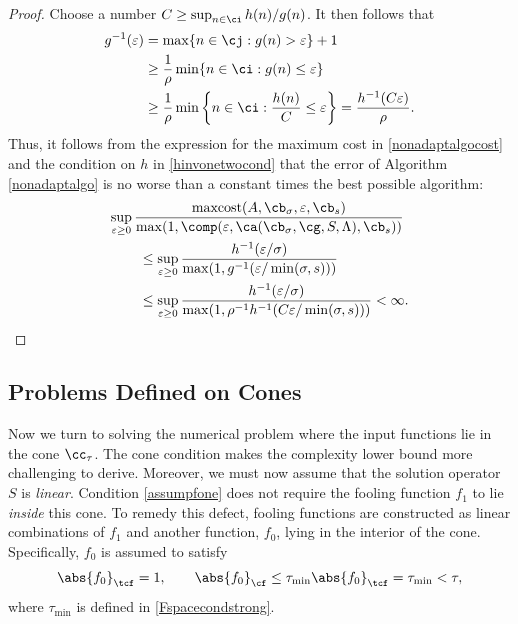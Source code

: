 \documentclass[]{elsarticle}
\DeclareMathOperator{\maxcost}{maxcost}
\theoremstyle{definition}
\theoremstyle{remark}
\newcommand{\Fnorm}[1]{\abs{#1}_{\cf}}
\newcommand{\Ftnorm}[1]{\abs{#1}_{\tcf}}
\begin{document}
\begin{proof}  Choose a number $C \ge \sup_{n \in \ci} h(n)/g(n)$.  It then follows that
\begin{align*}
g^{-1}(\varepsilon) &= \max \{ n \in \cj : g(n) > \varepsilon\}+1 \\ 
& \ge \frac{1}{\rho}\min\{ n \in \ci : g(n) \le \varepsilon\}  \\
& \ge \frac{1}{\rho} \min \left \{ n \in \ci : \frac{h(n)}{C} \le \varepsilon \right\} = \frac{h^{-1}(C \varepsilon)}{\rho}.
\end{align*}
Thus, it follows from the expression for the maximum cost in \eqref{nonadaptalgocost} and the condition on $h$ in \eqref{hinvonetwocond} that the error of Algorithm \ref{nonadaptalgo} is no worse than a constant times the best possible algorithm:
\begin{align*}
\MoveEqLeft{\sup_{\varepsilon \ge 0} \frac{\maxcost(A,\cb_{\sigma},\varepsilon,\cb_{s})}
{\max(1,\comp(\varepsilon,\ca(\cb_{\sigma},\cg,S,\Lambda),\cb_s))}} \\
& \le \sup_{\varepsilon \ge 0} \frac{h^{-1}(\varepsilon/\sigma)} {\max(1,g^{-1}(\varepsilon/\min(\sigma,s)))} \\
& \le \sup_{\varepsilon \ge 0} \frac{h^{-1}(\varepsilon/\sigma)} {\max(1,\rho^{-1} h^{-1}(C\varepsilon/\min(\sigma,s)))} <\infty.
\end{align*}
\end{proof}

\subsection{Problems Defined on Cones} \label{coneoptsubsec}

Now we turn to solving the numerical problem where the input functions lie in the cone $\cc_{\tau}$.  The cone condition makes the complexity lower bound more challenging to derive.  Moreover, we must now assume that the solution operator $S$ is \emph{linear}.  Condition \eqref{assumpfone} does not require the fooling function $f_1$ to lie \emph{inside} this cone.  To remedy this defect, fooling functions are constructed as linear combinations of $f_1$ and another function, $f_0$, lying in the interior of the cone.  Specifically, $f_0$ is assumed to satisfy
\begin{equation}
\label{assumpfzero}
\Ftnorm{f_{0}} = 1, \qquad \Fnorm{f_{0}} \le \tau_{\min} \Ftnorm{f_{0}} = \tau_{\min} < \tau,
\end{equation}
where $\tau_{\min}$ is defined in \eqref{Fspacecondstrong}.
\end{document}
